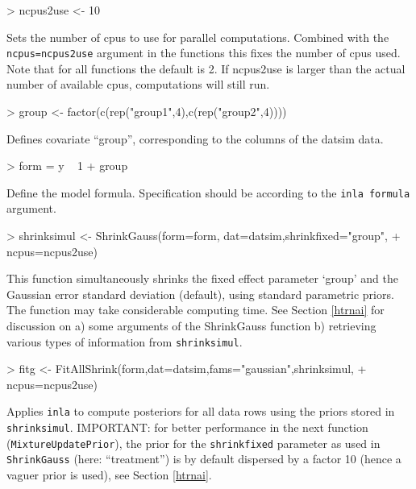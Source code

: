 \documentclass[11pt]{article}
\newcommand{\para}{\bigskip\noindent}
\begin{document}
\para
\begin{Schunk}
\begin{Sinput}
> ncpus2use <- 10
\end{Sinput}
\end{Schunk}
Sets the number of cpus to use for parallel computations. Combined
with the {\tt ncpus=ncpus2use} argument in the functions this fixes the number of cpus used.
Note that for all functions the default is 2. If ncpus2use is larger than the actual
number of available cpus, computations will still run.

\para
\begin{Schunk}
\begin{Sinput}
> group <- factor(c(rep("group1",4),c(rep("group2",4))))
\end{Sinput}
\end{Schunk}
Defines covariate ``group'', corresponding to the columns of the datsim data.

\para
\begin{Schunk}
\begin{Sinput}
> form = y ~  1 + group
\end{Sinput}
\end{Schunk}
Define the model formula. Specification should be according to the {\tt inla formula} argument.


\para
\begin{Schunk}
\begin{Sinput}
> shrinksimul <- ShrinkGauss(form=form, dat=datsim,shrinkfixed="group",
+ ncpus=ncpus2use)
\end{Sinput}
\end{Schunk}

This function simultaneously shrinks the fixed effect parameter
`group' and the Gaussian error standard deviation (default), using standard
parametric priors.
The function may take considerable computing time. See Section
\ref{htrnai} for discussion on a) some arguments of the
ShrinkGauss function b) retrieving various types of information
from {\tt shrinksimul}.


\para
\begin{Schunk}
\begin{Sinput}
> fitg <- FitAllShrink(form,dat=datsim,fams="gaussian",shrinksimul,
+ ncpus=ncpus2use)
\end{Sinput}
\end{Schunk}
Applies {\tt inla} to compute posteriors for all data rows using the priors stored in {\tt shrinksimul}. IMPORTANT:
for better performance in the next function ({\tt MixtureUpdatePrior}), the prior for the {\tt shrinkfixed} parameter as
used in {\tt ShrinkGauss} (here: ``treatment'') is by default dispersed by a factor 10 (hence a vaguer prior is used),
see Section \ref{htrnai}.
\end{document}
